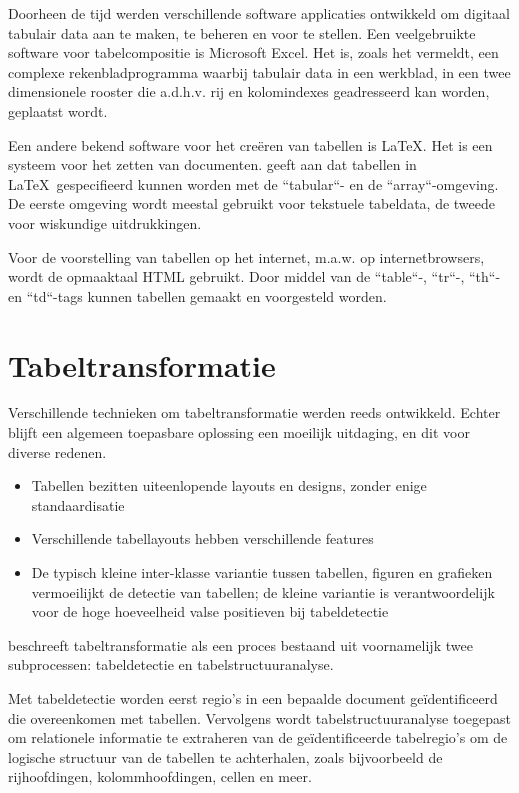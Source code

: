 Doorheen de tijd werden verschillende software applicaties ontwikkeld om digitaal tabulair data aan te maken, te beheren en voor te stellen. Een veelgebruikte software voor tabelcompositie is Microsoft Excel. Het is, zoals \textcite{Wang1996} het vermeldt, een complexe rekenbladprogramma waarbij tabulair data in een werkblad, in een twee dimensionele rooster die a.d.h.v. rij en kolomindexes geadresseerd kan worden, geplaatst wordt.

Een andere bekend software voor het creëren van tabellen is \LaTeX. Het is een systeem voor het zetten van documenten. \textcite{Wang1996} geeft aan dat tabellen in \LaTeX\ gespecifieerd kunnen worden met de ``tabular``- en de ``array``-omgeving. De eerste omgeving wordt meestal gebruikt voor tekstuele tabeldata, de tweede voor wiskundige uitdrukkingen.

Voor de voorstelling van tabellen op het internet, m.a.w. op internetbrowsers, wordt de opmaaktaal HTML gebruikt. Door middel van de ``table``-, ``tr``-, ``th``- en ``td``-tags kunnen tabellen gemaakt en voorgesteld worden.

\section{Tabeltransformatie}
\label{sec:tabel-transformatie}

Verschillende technieken om tabeltransformatie werden reeds ontwikkeld. Echter blijft een algemeen toepasbare oplossing een moeilijk uitdaging, en dit voor diverse redenen.

\begin{itemize}
    \item Tabellen bezitten uiteenlopende layouts en designs, zonder enige standaardisatie
          \autocite{Kasar2014}
    \item Verschillende tabellayouts hebben verschillende features \autocite{Kasar2014}
    \item De typisch kleine inter-klasse variantie tussen tabellen, figuren en grafieken vermoeilijkt
          de detectie van tabellen; de kleine variantie is verantwoordelijk voor de hoge hoeveelheid
          valse positieven bij tabeldetectie \autocite{Embley2006}
  \end{itemize}

\textcite{Kasar2014} beschreeft tabeltransformatie als een proces bestaand uit voornamelijk twee subprocessen: tabeldetectie en tabelstructuuranalyse. 

Met tabeldetectie worden eerst regio's in een bepaalde document geïdentificeerd die overeenkomen met tabellen. Vervolgens wordt tabelstructuuranalyse toegepast om relationele informatie te extraheren van de geïdentificeerde tabelregio's om de logische structuur van de tabellen te achterhalen, zoals bijvoorbeeld de rijhoofdingen, kolommhoofdingen, cellen en meer.

